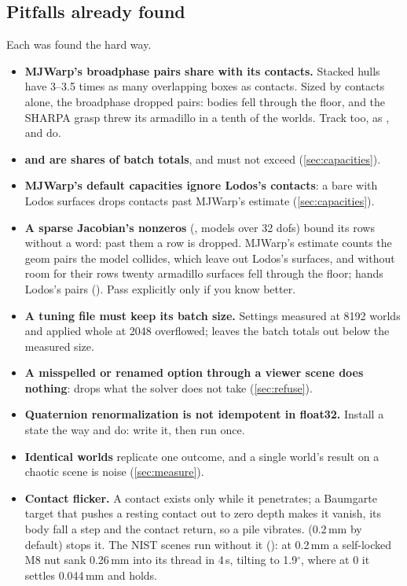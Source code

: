 \subsection{Pitfalls already found}\label{sec:found}

Each was found the hard way.

\begin{itemize}
\item \textbf{MJWarp's broadphase pairs share  with its contacts.} Stacked hulls have 3--3.5 times as many overlapping boxes as contacts. Sized by contacts alone, the broadphase dropped pairs: bodies fell through the floor, and the SHARPA grasp threw its armadillo in a tenth of the worlds. Track  too, as ,  and  do.
\item \textbf{ and  are shares of batch totals}, and  must not exceed  (\cref{sec:capacities}).
\item \textbf{MJWarp's default capacities ignore Lodos's contacts}: a bare  with Lodos surfaces drops contacts past MJWarp's estimate (\cref{sec:capacities}).
\item \textbf{A sparse Jacobian's nonzeros} (, models over 32 dofs) bound its rows without a word: past them a row is dropped. MJWarp's estimate counts the geom pairs the model collides, which leave out Lodos's surfaces, and without room for their rows twenty armadillo surfaces fell through the floor;  hands  Lodos's pairs (). Pass  explicitly only if you know better.
\item \textbf{A tuning file must keep its batch size.} Settings measured at 8192 worlds and applied whole at 2048 overflowed;  leaves the batch totals out below the measured size.
\item \textbf{A misspelled or renamed option through a viewer scene does nothing}:  drops what the solver does not take (\cref{sec:refuse}).
\item \textbf{Quaternion renormalization is not idempotent in float32.} Install a state the way  and  do: write it, then run  once.
\item \textbf{Identical worlds} replicate one outcome, and a single world's result on a chaotic scene is noise (\cref{sec:measure}).
\item \textbf{Contact flicker.} A contact exists only while it penetrates; a Baumgarte target that pushes a resting contact out to zero depth makes it vanish, its body fall a step and the contact return, so a pile vibrates.  (0.2\,mm by default) stops it. The NIST scenes run without it (): at 0.2\,mm a self-locked M8 nut sank 0.26\,mm into its thread in 4\,s, tilting to 1.9$^\circ$, where at 0 it settles 0.044\,mm and holds.

\end{itemize}
